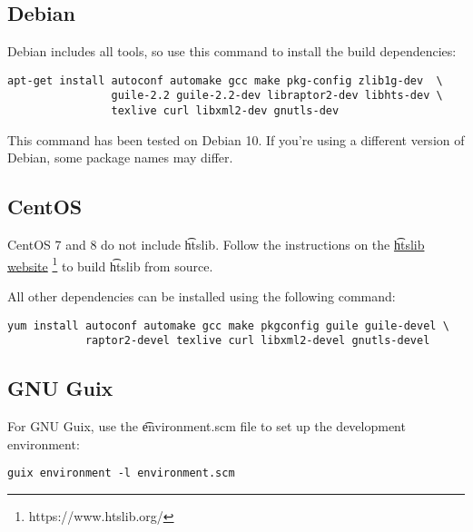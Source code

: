 \subsection{Debian}

  Debian includes all tools, so use this command to install the
  build dependencies:

\begin{siderules}
\begin{verbatim}
apt-get install autoconf automake gcc make pkg-config zlib1g-dev  \
                guile-2.2 guile-2.2-dev libraptor2-dev libhts-dev \
                texlive curl libxml2-dev gnutls-dev
\end{verbatim}
\end{siderules}

  This command has been tested on Debian 10.  If you're using a different
  version of Debian, some package names may differ.

\subsection{CentOS}

  CentOS 7 and 8 do not include \t{htslib}.  Follow the instructions on
  the \href{https://www.htslib.org/}{\t{htslib} website}%
  \footnote{https://www.htslib.org/} to build \t{htslib} from source.

  All other dependencies can be installed using the following command:

\begin{siderules}
\begin{verbatim}
yum install autoconf automake gcc make pkgconfig guile guile-devel \
            raptor2-devel texlive curl libxml2-devel gnutls-devel
\end{verbatim}
\end{siderules}

\subsection{GNU Guix}

  For GNU Guix, use the \t{environment.scm} file to set up the development
  environment:

\begin{siderules}
\begin{verbatim}
guix environment -l environment.scm
\end{verbatim}
\end{siderules}

